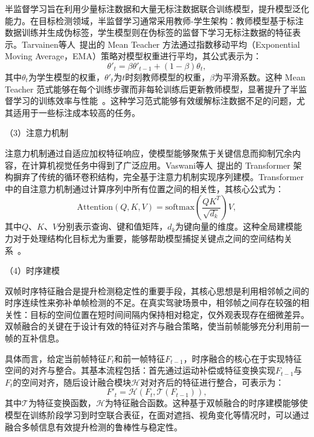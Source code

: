 半监督学习旨在利用少量标注数据和大量无标注数据联合训练模型，提升模型泛化能力。在目标检测领域，半监督学习通常采用教师-学生架构：教师模型基于标注数据训练并生成伪标签，学生模型则在伪标签的监督下学习无标注数据的特征表示。Tarvainen等人~\cite{tarvainen2017mean}提出的 Mean Teacher 方法通过指数移动平均（Exponential Moving Average，EMA）策略对模型权重进行平均，其公式表示为：
\begin{equation}
\theta'_t = \beta \theta'_{t-1} + (1-\beta) \theta_t,
\end{equation}
其中$\theta_t$为学生模型的权重，$\theta'_t$为$t$时刻教师模型的权重，$\beta$为平滑系数。这种 Mean Teacher 范式能够在每个训练步骤而非每轮训练后更新教师模型，显著提升了半监督学习的训练效率与性能~\cite{sohn2020fixmatch}。这种学习范式能够有效缓解标注数据不足的问题，尤其适用于一些标注成本较高的任务。

（3）注意力机制

注意力机制通过自适应加权特征响应，使模型能够聚焦于关键信息而抑制冗余内容，在计算机视觉任务中得到了广泛应用。Vaswani等人~\cite{vaswani2017attention}提出的 Transformer 架构摒弃了传统的循环卷积结构，完全基于注意力机制实现序列建模。Transformer 中的自注意力机制通过计算序列中所有位置之间的相关性，其核心公式为：
\begin{equation}
\text{Attention}(Q, K, V) = \text{softmax}\left(\frac{QK^T}{\sqrt{d_k}}\right)V,
\end{equation}
其中$Q$、$K$、$V$分别表示查询、键和值矩阵，$d_k$为键向量的维度。这种全局建模能力对于处理结构化目标尤为重要，能够帮助模型捕捉关键点之间的空间结构关系~\cite{min2021attentional}。

（4）时序建模

双帧时序特征融合是提升检测稳定性的重要手段，其核心思想是利用相邻帧之间的时序连续性来弥补单帧检测的不足。在真实驾驶场景中，相邻帧之间存在较强的相关性：目标的空间位置在短时间间隔内保持相对稳定，仅外观表现存在细微差异。双帧融合的关键在于设计有效的特征对齐与融合策略，使当前帧能够充分利用前一帧的互补信息。

具体而言，给定当前帧特征$F_t$和前一帧特征$F_{t-1}$，时序融合的核心在于实现特征空间的对齐与整合。其基本流程包括：首先通过运动补偿或特征变换实现$F_{t-1}$与$F_t$的空间对齐，随后设计融合模块$\mathcal{H}$对对齐后的特征进行整合，可表示为：
\begin{equation}
F'_t = \mathcal{H}(F_t, \mathcal{T}(F_{t-1})),
\end{equation}
其中$\mathcal{T}$为特征变换函数，$\mathcal{H}$为特征融合函数。这种基于双帧融合的时序建模能够使模型在训练阶段学习到时空联合表征，在面对遮挡、视角变化等情况时，可以通过融合多帧信息有效提升检测的鲁棒性与稳定性。


